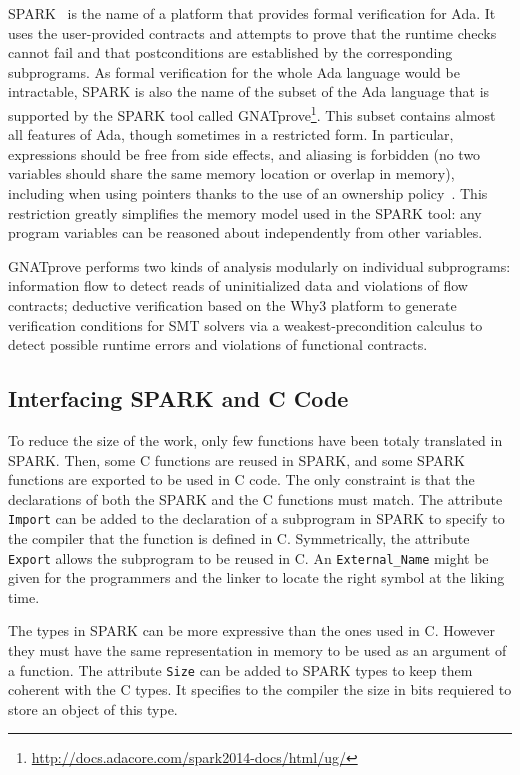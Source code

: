 \documentclass[runningheads]{llncs}
\begin{document}
SPARK~\cite{mccormick2015building} is the name of a platform that provides
formal verification for Ada. It uses the user-provided contracts and attempts
to prove that the runtime checks cannot fail and that postconditions are
established by the corresponding subprograms.  As formal verification for the
whole Ada language would be intractable, SPARK is also the name of the subset
of the Ada language that is supported by the SPARK tool called
GNATprove\footnote{\url{http://docs.adacore.com/spark2014-docs/html/ug/}}.
This subset contains almost all features of Ada, though sometimes in a
restricted form.  In particular, expressions should be free from side effects,
and aliasing is forbidden (no two variables should share the same memory
location or overlap in memory), including when using pointers thanks to the use
of an ownership policy~\cite{dross2020recursive}.  This restriction greatly
simplifies the memory model used in the SPARK tool: any program variables can
be reasoned about independently from other variables.

GNATprove performs two kinds of analysis modularly on individual subprograms:
information flow to detect reads of uninitialized data and violations of flow
contracts; deductive verification based on the Why3 platform to generate
verification conditions for SMT solvers via a weakest-precondition calculus to
detect possible runtime errors and violations of functional contracts.

\subsection{Interfacing SPARK and C Code}

    To reduce the size of the work, only few functions have been totaly translated
    in SPARK. Then, some C functions are reused in SPARK, and some SPARK functions
    are exported to be used in C code. The only constraint is that the
    declarations of both the SPARK and the C functions must match.
    The attribute \lstinline{Import} can be added to the declaration of a
    subprogram in SPARK to specify to the compiler that the function is defined
    in C. Symmetrically, the attribute \lstinline{Export} allows the subprogram
    to be reused in C. An \lstinline{External_Name} might be given for the
    programmers and the linker to locate the right symbol at the liking time.


    The types in SPARK can be more expressive than the ones used in C. However
    they must have the same representation in memory to be used as an argument
    of a function. The attribute \lstinline{Size} can be added to SPARK types
    to keep them coherent with the C types. It specifies to the compiler the
    size in bits requiered to store an object of this type.
\end{document}
